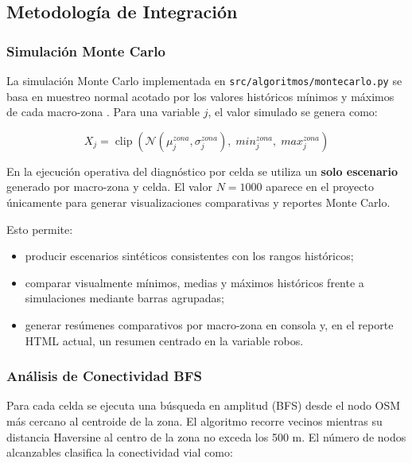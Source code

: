 \documentclass[11pt]{article}
\begin{document}
\subsection{Metodología de Integración}

\subsubsection{Simulación Monte Carlo}

La simulación Monte Carlo implementada en \texttt{src/algoritmos/montecarlo.py} se basa en muestreo normal acotado por los valores históricos mínimos y máximos de cada macro-zona \cite{b3}. Para una variable $j$, el valor simulado se genera como:

\begin{equation}
    X_j = \operatorname{clip}\!\left(\mathcal{N}(\mu_j^{zona}, \sigma_j^{zona}),\; min_j^{zona},\; max_j^{zona}\right)
\end{equation}

En la ejecución operativa del diagnóstico por celda se utiliza un \textbf{solo escenario} generado por macro-zona y celda. El valor $N = 1000$ aparece en el proyecto únicamente para generar visualizaciones comparativas y reportes Monte Carlo.

Esto permite:
\begin{itemize}
    \item producir escenarios sintéticos consistentes con los rangos históricos;
    \item comparar visualmente mínimos, medias y máximos históricos frente a simulaciones mediante barras agrupadas;
    \item generar resúmenes comparativos por macro-zona en consola y, en el reporte HTML actual, un resumen centrado en la variable robos.
\end{itemize}

\subsubsection{Análisis de Conectividad BFS}

Para cada celda se ejecuta una búsqueda en amplitud (BFS) desde el nodo OSM más cercano al centroide de la zona. El algoritmo recorre vecinos mientras su distancia Haversine al centro de la zona no exceda los 500 m. El número de nodos alcanzables clasifica la conectividad vial como:
\end{document}
